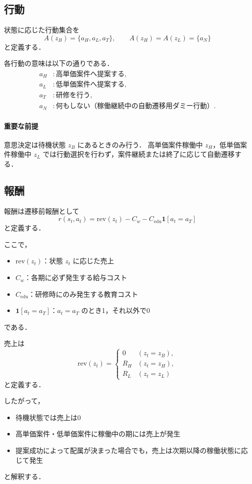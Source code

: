 \documentclass[11pt,a4paper]{bxjsarticle}
\begin{document}
\subsection{行動}

状態に応じた行動集合を
\[
    A(z_B)=\{a_H,a_L,a_T\}, \qquad A(z_H)=A(z_L)=\{a_N\}
\]
と定義する．

各行動の意味は以下の通りである．
\begin{align*}
    a_H &: \text{高単価案件へ提案する},\\
    a_L &: \text{低単価案件へ提案する},\\
    a_T &: \text{研修を行う},\\
    a_N &: \text{何もしない（稼働継続中の自動遷移用ダミー行動）}.
\end{align*}

\paragraph{重要な前提}
意思決定は待機状態 \(z_B\) にあるときのみ行う．
高単価案件稼働中 \(z_H\)，低単価案件稼働中 \(z_L\) では行動選択を行わず，案件継続または終了に応じて自動遷移する．

\subsection{報酬}

報酬は遷移前報酬として
\[
    r(s_t,a_t)=\mathrm{rev}(z_t)-C_w-C_{\mathrm{edu}}\mathbf{1}[a_t=a_T]
\]
と定義する．

ここで，
\begin{itemize}[leftmargin=2em]
    \item \(\mathrm{rev}(z_t)\)：状態 \(z_t\) に応じた売上
    \item \(C_w\)：各期に必ず発生する給与コスト
    \item \(C_{\mathrm{edu}}\)：研修時にのみ発生する教育コスト
    \item \(\mathbf{1}[a_t=a_T]\)：\(a_t=a_T\) のとき1，それ以外で0
\end{itemize}
である．

売上は
\[
    \mathrm{rev}(z_t)=
    \begin{cases}
        0   & (z_t=z_B),\\
        R_H & (z_t=z_H),\\
        R_L & (z_t=z_L)
    \end{cases}
\]
と定義する．

したがって，
\begin{itemize}[leftmargin=2em]
    \item 待機状態では売上は0
    \item 高単価案件・低単価案件に稼働中の期には売上が発生
    \item 提案成功によって配属が決まった場合でも，売上は次期以降の稼働状態に応じて発生
\end{itemize}
と解釈する．
\end{document}
